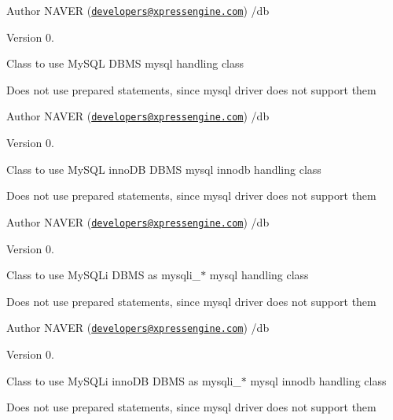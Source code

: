 \begin{DoxyAuthor}{Author}
N\-A\-V\-E\-R (\href{mailto:developers@xpressengine.com}{\tt developers@xpressengine.\-com}) /db 
\end{DoxyAuthor}
\begin{DoxyVersion}{Version}
0.
\end{DoxyVersion}
Class to use My\-S\-Q\-L D\-B\-M\-S mysql handling class

Does not use prepared statements, since mysql driver does not support them

\begin{DoxyAuthor}{Author}
N\-A\-V\-E\-R (\href{mailto:developers@xpressengine.com}{\tt developers@xpressengine.\-com}) /db 
\end{DoxyAuthor}
\begin{DoxyVersion}{Version}
0.
\end{DoxyVersion}
Class to use My\-S\-Q\-L inno\-D\-B D\-B\-M\-S mysql innodb handling class

Does not use prepared statements, since mysql driver does not support them

\begin{DoxyAuthor}{Author}
N\-A\-V\-E\-R (\href{mailto:developers@xpressengine.com}{\tt developers@xpressengine.\-com}) /db 
\end{DoxyAuthor}
\begin{DoxyVersion}{Version}
0.
\end{DoxyVersion}
Class to use My\-S\-Q\-Li D\-B\-M\-S as mysqli\-\_\-$\ast$ mysql handling class

Does not use prepared statements, since mysql driver does not support them

\begin{DoxyAuthor}{Author}
N\-A\-V\-E\-R (\href{mailto:developers@xpressengine.com}{\tt developers@xpressengine.\-com}) /db 
\end{DoxyAuthor}
\begin{DoxyVersion}{Version}
0.
\end{DoxyVersion}
Class to use My\-S\-Q\-Li inno\-D\-B D\-B\-M\-S as mysqli\-\_\-$\ast$ mysql innodb handling class

Does not use prepared statements, since mysql driver does not support them

